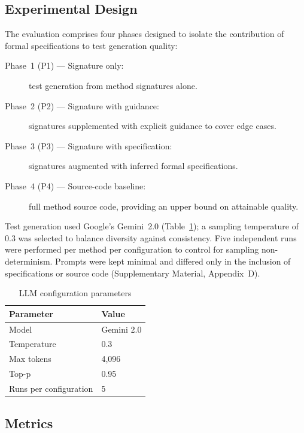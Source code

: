 \documentclass[11pt]{article}
\begin{document}
\subsection{Experimental Design}

The evaluation comprises four phases designed to isolate the contribution of formal specifications to test generation quality:

\begin{description}
    \item[Phase~1 (P1) --- Signature only:] test generation from method signatures alone.
    \item[Phase~2 (P2) --- Signature with guidance:] signatures supplemented with explicit guidance to cover edge cases.
    \item[Phase~3 (P3) --- Signature with specification:] signatures augmented with inferred formal specifications.
    \item[Phase~4 (P4) --- Source-code baseline:] full method source code, providing an upper bound on attainable quality.
\end{description}

Test generation used Google's Gemini~2.0 (Table~\ref{tab:llm-config}); a sampling temperature of 0.3 was selected to balance diversity against consistency. Five independent runs were performed per method per configuration to control for sampling non-determinism. Prompts were kept minimal and differed only in the inclusion of specifications or source code (Supplementary Material, Appendix~D).

\begin{table}[ht]
\centering
\caption{LLM configuration parameters}
\label{tab:llm-config}
\begin{tabular}{ll}
\toprule
\textbf{Parameter} & \textbf{Value} \\
\midrule
Model & Gemini 2.0 \\
Temperature & 0.3 \\
Max tokens & 4,096 \\
Top-p & 0.95 \\
Runs per configuration & 5 \\
\bottomrule
\end{tabular}
\end{table}

\subsection{Metrics}
\end{document}
